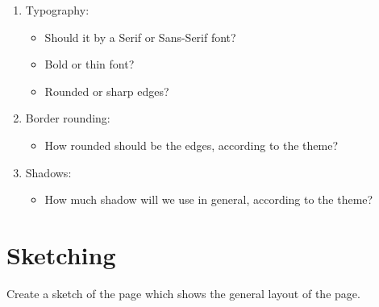 \documentclass{article}
\begin{document}
\begin{enumerate}
\begin{itemize}
    \end{itemize}
    \item Typography:
    \begin{itemize}
        \item Should it by a Serif or Sans-Serif font?
        \item Bold or thin font?
        \item Rounded or sharp edges?
    \end{itemize}
    \item Border rounding:
    \begin{itemize}
        \item How rounded should be the edges, according to the theme?
    \end{itemize}
        \item Shadows:
    \begin{itemize}
        \item How much shadow will we use in general, according to the theme?
    \end{itemize}
\end{enumerate}


\newpage
\section{Sketching}
Create a sketch of the page which shows the general layout of the page.

\noindent\hrulefill
\end{document}
